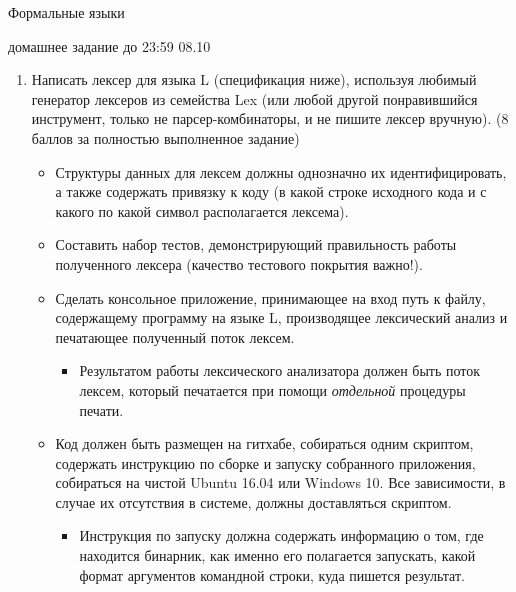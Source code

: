 \documentclass{article}
\begin{document}
\begin{center} {\LARGE Формальные языки} \end{center}

\begin{center} {\Large домашнее задание до 23:59 08.10} \end{center}
\bigskip

\begin{enumerate}
  \item Написать лексер для языка L (спецификация ниже), используя любимый генератор лексеров из семейства Lex (или любой другой понравившийся инструмент, только не парсер-комбинаторы, и не пишите лексер вручную). (8 баллов за полностью выполненное задание)
    \begin{itemize}
        \item Структуры данных для лексем должны однозначно их идентифицировать, а также содержать привязку к коду (в какой строке исходного кода и с какого по какой символ располагается лексема). 
        \item Составить набор тестов, демонстрирующий правильность работы полученного лексера (качество тестового покрытия важно!).
        \item Сделать консольное  приложение, принимающее на вход путь к файлу, содержащему программу на языке L, производящее лексический анализ и печатающее полученный поток лексем.
        \begin{itemize}
            \item Результатом работы лексического анализатора должен быть поток лексем, который печатается при помощи \emph{отдельной} процедуры печати. 
        \end{itemize}
        \item Код должен быть размещен на гитхабе, собираться одним скриптом, содержать инструкцию по сборке и запуску собранного приложения, собираться на чистой Ubuntu 16.04 или Windows 10. Все зависимости, в случае их отсутствия в системе, должны доставляться скриптом.
        \begin{itemize}
            \item Инструкция по запуску должна содержать информацию о том, где находится бинарник, как именно его полагается запускать, какой формат аргументов командной строки, куда пишется результат.
        \end{itemize} 
     \end{itemize}
\end{enumerate}
\end{document}
